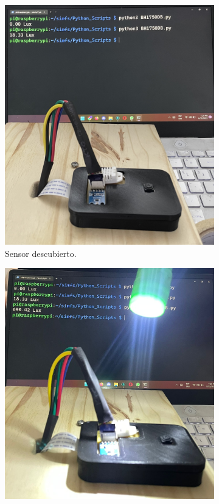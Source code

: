 \begin{figure}[H]
\begin{subfigure}{0.33\textwidth}
        \includegraphics[width=\linewidth]{ImagenesValidacion del prototipo/TINTFUN3b}
        \caption{Sensor descubierto.}
	\end{subfigure}\hfill
    \begin{subfigure}{0.33\textwidth}
    	\centering \vspace*{2.5mm}
        \includegraphics[width=\linewidth]{ImagenesValidacion del prototipo/TINTFUN3c}

\end{subfigure}
\end{figure}
